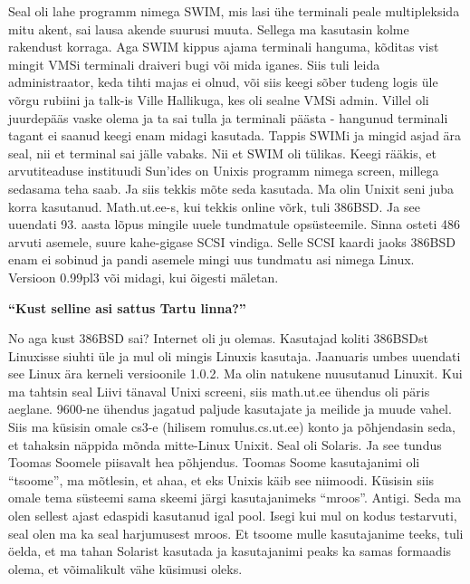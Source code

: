 Seal oli lahe programm nimega SWIM, mis lasi ühe terminali peale multipleksida
mitu akent, sai lausa akende suurusi muuta. Sellega ma kasutasin kolme
rakendust korraga. Aga SWIM kippus ajama terminali hanguma, kõditas vist mingit
VMSi terminali draiveri bugi või mida iganes. Siis tuli leida administraator,
keda tihti majas ei olnud, või siis keegi sõber tudeng logis üle võrgu
rubiini ja talk-is Ville
Hallikuga, kes oli sealne VMSi admin. Villel oli
juurdepääs vaske olema ja ta sai tulla ja terminali päästa - hangunud terminali
tagant ei saanud keegi enam midagi kasutada. Tappis SWIMi ja mingid asjad ära
seal, nii et terminal sai jälle vabaks. Nii et SWIM oli tülikas. Keegi rääkis,
et arvutiteaduse instituudi Sun'ides on Unixis programm nimega screen, millega
sedasama teha saab. Ja siis tekkis mõte seda kasutada. Ma olin Unixit seni juba
korra kasutanud. Math.ut.ee-s, kui tekkis online
võrk, tuli 386BSD. Ja see uuendati 93. aasta lõpus mingile
uuele tundmatule opsüsteemile. Sinna osteti 486 arvuti asemele, suure
kahe-gigase SCSI vindiga. Selle SCSI kaardi
jaoks 386BSD enam ei sobinud ja pandi asemele mingi uus tundmatu asi nimega
Linux. Versioon 0.99pl3 või midagi, kui õigesti mäletan.

\textbf{\enquote{Kust selline asi sattus Tartu linna?}}

No aga kust 386BSD sai? Internet oli ju olemas. Kasutajad koliti 386BSDst
Linuxisse siuhti üle ja mul oli mingis Linuxis kasutaja. Jaanuaris umbes
uuendati see Linux ära kerneli versioonile 1.0.2. Ma olin natukene nuusutanud
Linuxit. Kui ma tahtsin seal Liivi tänaval Unixi screeni, siis math.ut.ee
ühendus oli päris aeglane. 9600-ne ühendus jagatud paljude kasutajate ja meilide ja muude
vahel. Siis ma küsisin omale cs3-e (hilisem
romulus.cs.ut.ee) konto ja põhjendasin seda, et
tahaksin näppida mõnda mitte-Linux Unixit. Seal oli Solaris.
Ja see tundus Toomas Soomele piisavalt hea põhjendus.
Toomas Soome kasutajanimi oli \enquote{tsoome}, ma mõtlesin, et ahaa, et eks
Unixis käib see niimoodi. Küsisin siis omale tema süsteemi sama skeemi järgi
kasutajanimeks \enquote{mroos}. Antigi. Seda ma olen sellest ajast edaspidi
kasutanud igal pool. Isegi kui mul on kodus testarvuti, seal olen ma ka seal
harjumusest mroos. Et tsoome mulle kasutajanime teeks, tuli öelda, et ma tahan
Solarist kasutada ja kasutajanimi peaks ka samas formaadis olema, et
võimalikult vähe küsimusi oleks.

